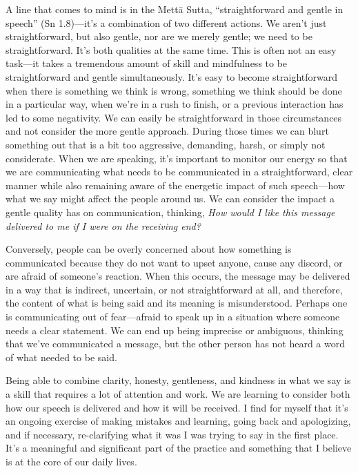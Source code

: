 A line that comes to mind is in the Mettā Sutta, ``straightforward and 
gentle in speech'' (Sn 1.8)---it's a combination of two different 
actions. We aren't just straightforward, but also gentle, nor are we 
merely gentle; we need to be straightforward. It's both qualities at 
the same time. This is often not an easy task---it takes a tremendous 
amount of skill and mindfulness to be straightforward and gentle 
simultaneously. It's easy to become straightforward when there is 
something we think is wrong, something we think should be done in a 
particular way, when we're in a rush to finish, or a previous 
interaction has led to some negativity. We can easily be 
straightforward in those circumstances and not consider the more gentle 
approach. During those times we can blurt something out that is a bit 
too aggressive, demanding, harsh, or simply not considerate. When we 
are speaking, it's important to monitor our energy so that we are 
communicating what needs to be communicated in a straightforward, clear 
manner while also remaining aware of the energetic impact of such 
speech---how what we say might affect the people around us. We can 
consider the impact a gentle quality has on communication, thinking, 
\emph{How would I like this message delivered to me if I were on the 
receiving end?}

Conversely, people can be overly concerned about how something is 
communicated because they do not want to upset anyone, cause any 
discord, or are afraid of someone's reaction. When this occurs, the 
message may be delivered in a way that is indirect, uncertain, or not 
straightforward at all, and therefore, the content of what is being 
said and its meaning is misunderstood. Perhaps one is communicating out 
of fear---afraid to speak up in a situation where someone needs a clear 
statement. We can end up being imprecise or ambiguous, thinking that 
we've communicated a message, but the other person has not heard a word 
of what needed to be said.

Being able to combine clarity, honesty, gentleness, and kindness in 
what we say is a skill that requires a lot of attention and work. We 
are learning to consider both how our speech is delivered and how it 
will be received. I find for myself that it's an ongoing exercise of 
making mistakes and learning, going back and apologizing, and if 
necessary, re-clarifying what it was I was trying to say in the first 
place. It's a meaningful and significant part of the practice and 
something that I believe is at the core of our daily lives.

